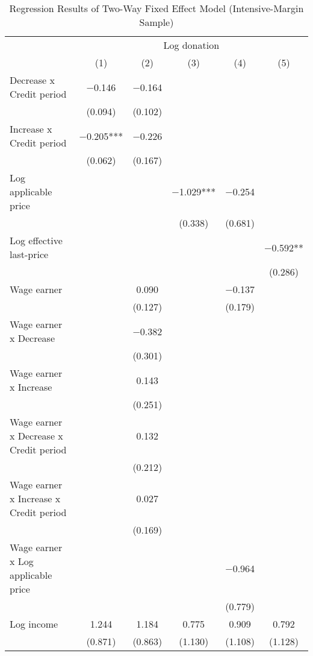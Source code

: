 \begin{table}

\caption{Regression Results of Two-Way Fixed Effect Model (Intensive-Margin Sample)\label{tab:fe-model-int}}
\centering
\fontsize{8}{10}\selectfont
\begin{threeparttable}
\begin{tabular}[t]{lccccc}
\toprule
\multicolumn{1}{c}{ } & \multicolumn{5}{c}{Log donation} \\
\cmidrule(l{3pt}r{3pt}){2-6}
  & (1) & (2) & (3) & (4) & (5)\\
\midrule
Decrease x Credit period & \num{-0.146} & \num{-0.164} &  &  & \\
 & (\num{0.094}) & (\num{0.102}) &  &  & \\
Increase x Credit period & \num{-0.205}*** & \num{-0.226} &  &  & \\
 & (\num{0.062}) & (\num{0.167}) &  &  & \\
Log applicable price &  &  & \num{-1.029}*** & \num{-0.254} & \\
 &  &  & (\num{0.338}) & (\num{0.681}) & \\
Log effective last-price &  &  &  &  & \num{-0.592}**\\
 &  &  &  &  & (\num{0.286})\\
Wage earner &  & \num{0.090} &  & \num{-0.137} & \\
 &  & (\num{0.127}) &  & (\num{0.179}) & \\
Wage earner x Decrease &  & \num{-0.382} &  &  & \\
 &  & (\num{0.301}) &  &  & \\
Wage earner x Increase &  & \num{0.143} &  &  & \\
 &  & (\num{0.251}) &  &  & \\
Wage earner x Decrease x Credit period &  & \num{0.132} &  &  & \\
 &  & (\num{0.212}) &  &  & \\
Wage earner x Increase x Credit period &  & \num{0.027} &  &  & \\
 &  & (\num{0.169}) &  &  & \\
Wage earner x Log applicable price &  &  &  & \num{-0.964} & \\
 &  &  &  & (\num{0.779}) & \\
Log income & \num{1.244} & \num{1.184} & \num{0.775} & \num{0.909} & \num{0.792}\\
 & (\num{0.871}) & (\num{0.863}) & (\num{1.130}) & (\num{1.108}) & (\num{1.128})\\

\end{tabular}
\end{threeparttable}
\end{table}
